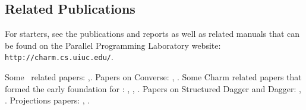 \subsection{Related Publications}
\label{publications}

For starters, see the publications and reports as well
as related manuals that can be found on the Parallel Programming
Laboratory website: {\tt http://charm.cs.uiuc.edu/}. 

Some \charmpp\ related papers:
\cite{CharmppPPWCPP96},\cite{CharmppOOPSLA93}.  Papers on {\sc Converse}:
\cite{ConverseRTSPP98}, \cite{InterOpIPPS96}. Some
{\sc Charm} related papers that formed the early foundation for \charmpp:
\cite{CharmSys1TPDS94}, \cite{CharmSys2TPDS94},
\cite{CharmOverviewINTL93}.  Papers on Structured Dagger and Dagger: 
\cite{DaggerSyncIPPS94}, \cite{StructDaggerEURO96}.  Projections
papers: \cite{ProjectionsIPPS93}, \cite{Projections}.